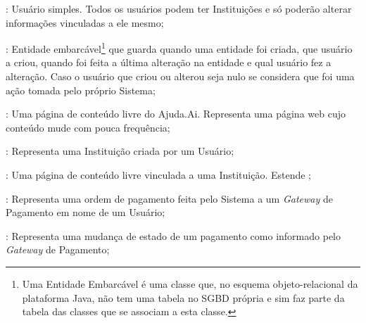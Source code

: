 \begin{lista}
\item {}: Usuário simples. Todos os usuários podem ter Instituições e só poderão alterar informações vinculadas a ele mesmo;

\item {}: Entidade embarcável\footnote{Uma Entidade Embarcável é uma classe que, no esquema objeto-relacional da plataforma Java, não tem uma tabela no SGBD própria e sim faz parte da tabela das classes que se associam a esta classe.} que guarda quando uma entidade foi criada, que usuário a criou, quando foi feita a última alteração na entidade e qual usuário fez a alteração. Caso o usuário que criou ou alterou seja nulo se considera que foi uma ação tomada pelo próprio Sistema;
\item {}: Uma página de conteúdo livre do Ajuda.Ai. Representa uma página web cujo conteúdo mude com pouca frequência;

\item {}: Representa uma Instituição criada por um Usuário;
\item {}: Uma página de conteúdo livre vinculada a uma Instituição. Estende ;

\item {}: Representa uma ordem de pagamento feita pelo Sistema a um \emph{Gateway} de Pagamento em nome de um Usuário;
\item {}: Representa uma mudança de estado de um pagamento como informado pelo \emph{Gateway} de Pagamento;
\end{lista}


